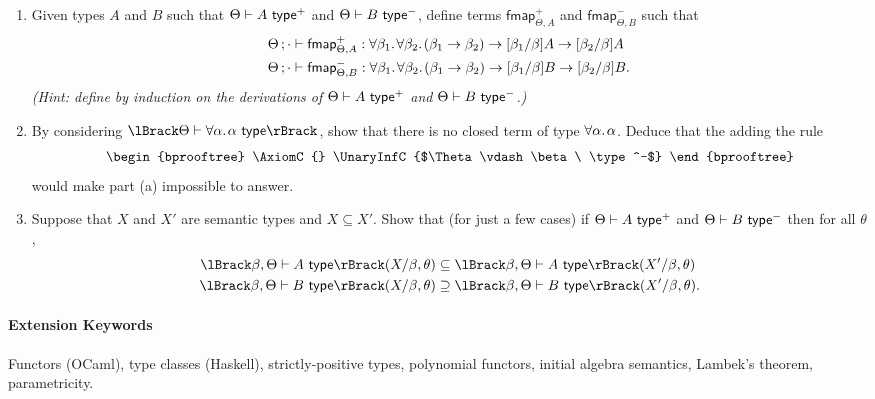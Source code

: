 \documentclass[11pt,a4paper,twoside]{article}
\begin{document}
\begin{enumerate}[label=(\alph*)]
  \item Given types $A$ and $B$ such that $\Theta \vdash A\ \mathsf{type}^+$
    and $\Theta \vdash B\ \mathsf{type}^-$,
    define terms $\mathsf{fmap}^+_{\Theta, A}$ and
    $\mathsf{fmap}^-_{\Theta, B}$ such that
    \begin{align*}
      \Theta \, ; \cdot &\vdash \mathsf{fmap}^+_{\Theta, A} :
      \forall \beta_1 .\;\! \forall \beta_2 .\;\! (\beta_1 \to \beta_2) \to
      [\beta_1 / \beta] A \to [\beta_2 / \beta] A \\
      \Theta \, ; \cdot &\vdash \mathsf{fmap}^-_{\Theta, B} :
      \forall \beta_1 .\;\! \forall \beta_2 .\;\! (\beta_1 \to \beta_2) \to
      [\beta_1 / \beta] B \to [\beta_2 / \beta] B.
    \end{align*}
    \emph{(Hint: define by induction on the derivations of $\Theta
    \vdash A\ \mathsf{type}^+$ and $\Theta \vdash B\ \mathsf{type}^-$.)}

  \item By considering $\sem{\Theta \vdash \fora{\alpha}{\alpha}\ \type}$,
    show that there is no closed term of type $\forall \alpha .\;\! \alpha$.
    Deduce that the adding the rule
    \[
      \begin{bprooftree}
        \AxiomC{}
        \UnaryInfC{$\Theta \vdash \beta\ \type^-$}
      \end{bprooftree}
    \]
    would make part (a) impossible to answer.

  \item Suppose that $X$ and $X'$ are semantic types and $X \subseteq X'$.
    Show that (for just a few cases) if $\Theta \vdash A\ \mathsf{type}^+$
    and $\Theta \vdash B\ \mathsf{type}^-$ then for all $\theta$,
    \begin{align*}
      \sem{\beta, \Theta \vdash A\ \type}(X/\beta, \theta)
      & \subseteq
      \sem{\beta, \Theta \vdash A\ \type}(X'/\beta, \theta)
      \\
      \sem{\beta, \Theta \vdash B\ \type}(X/\beta, \theta)
      & \supseteq
      \sem{\beta, \Theta \vdash B\ \type}(X'/\beta, \theta).
    \end{align*}
\end{enumerate}

\paragraph{Extension Keywords} Functors (OCaml), type classes
(Haskell), strictly-positive types, polynomial functors, initial
algebra semantics, Lambek's theorem, parametricity.

\end{document}
